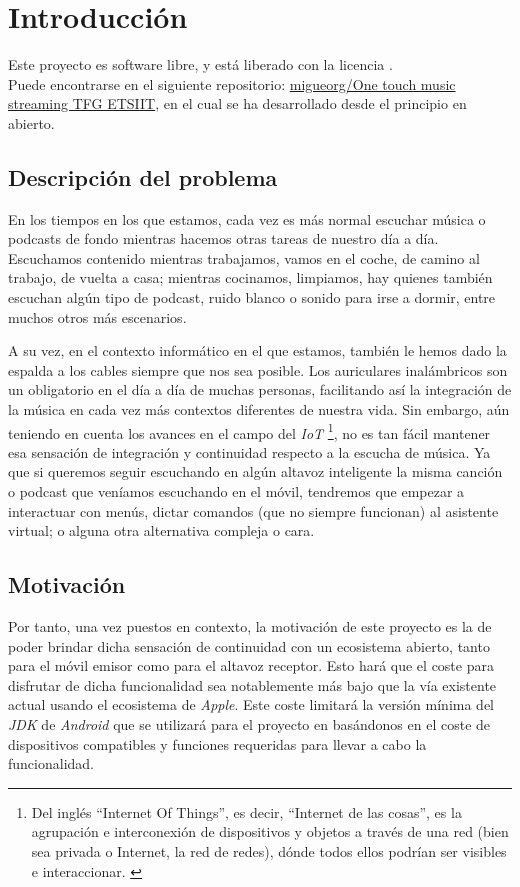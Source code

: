 \chapter{Introducción} \label{introduccion}

Este proyecto es software libre, y está liberado con la licencia \cite{gplv3}.\\

Puede encontrarse en el siguiente repositorio:
\href{https://github.com/migueorg/One-touch-music-streaming-TFG-ETSIIT/}{migueorg/One touch music streaming TFG ETSIIT}, 
en el cual se ha desarrollado desde el principio en abierto.

\section{Descripción del problema}
En los tiempos en los que estamos, cada vez es más normal escuchar música o
podcasts de fondo mientras hacemos otras tareas de nuestro día a día. Escuchamos
contenido mientras trabajamos, vamos en el coche, de camino al trabajo, de
vuelta a casa; mientras cocinamos, limpiamos, hay quienes también escuchan algún
tipo de podcast, ruido blanco o sonido para irse a dormir, entre muchos otros
más escenarios. 

A su vez, en el contexto informático en el que estamos, también le hemos dado la
espalda a los cables siempre que nos sea posible. Los auriculares inalámbricos
son un obligatorio en el día a día de muchas personas, facilitando así la
integración de la música en cada vez más contextos diferentes de nuestra vida.
Sin embargo, aún teniendo en cuenta los avances en el campo del \emph{IoT}
\footnote{Del inglés ``Internet Of Things'', es decir, ``Internet de las cosas'', es
la agrupación e interconexión de dispositivos y objetos a través de una red
(bien sea privada o Internet, la red de redes), dónde todos ellos podrían ser
visibles e interaccionar. \cite{IoT}}, no es tan fácil mantener esa sensación de
integración y continuidad respecto a la escucha de música. Ya que si queremos
seguir escuchando en algún altavoz inteligente la misma canción o podcast que
veníamos escuchando en el móvil, tendremos que empezar a interactuar con menús,
dictar comandos (que no siempre funcionan) al asistente virtual; o alguna otra
alternativa compleja o cara.\\

\section{Motivación}
Por tanto, una vez puestos en contexto, la motivación de este proyecto es la de
poder brindar dicha sensación de continuidad con un ecosistema abierto, tanto
para el móvil emisor como para el altavoz receptor. Esto hará que el coste para
disfrutar de dicha funcionalidad sea notablemente más bajo que la vía existente
actual usando el ecosistema de \emph{Apple}. Este coste limitará la versión
mínima del \emph{JDK} de \emph{Android} que se utilizará para el proyecto en
basándonos en el coste de dispositivos compatibles y funciones requeridas para
llevar a cabo la funcionalidad.

